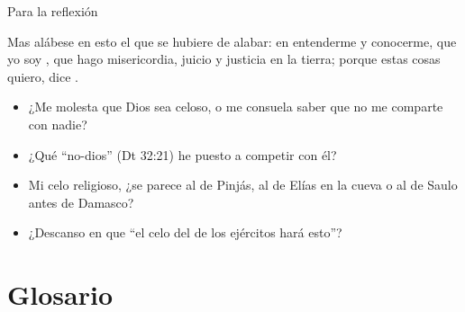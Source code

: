 \begin{frame}{Para la reflexión}
\begin{cita}Mas alábese en esto el que se hubiere de alabar: en entenderme y conocerme, que yo soy \SENOR, que hago misericordia, juicio y justicia en la tierra; porque estas cosas quiero, dice \SENOR.\end{cita}
\begin{center}\end{center}
\small
\begin{itemize}
\item ¿Me molesta que Dios sea celoso, o me consuela saber que no me comparte con nadie?
\item ¿Qué ``no-dios'' (Dt 32:21) he puesto a competir con él?
\item Mi celo religioso, ¿se parece al de Pinjás, al de Elías en la cueva o al de Saulo antes de Damasco?
\item ¿Descanso en que ``el celo del \SENOR{} de los ejércitos hará esto''?
\end{itemize}
\end{frame}

\section{Glosario}

